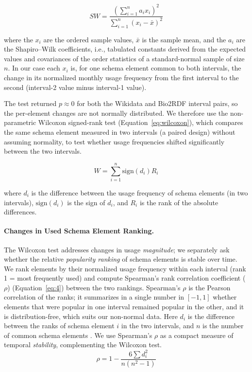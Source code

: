 \documentclass[sw]{iosart2x}
\begin{document}
\begin{equation}
SW = \frac{\left( \sum_{i=1}^n a_i x_i \right)^2}{\sum_{i=1}^n (x_i - \bar{x})^2}
\label{eq:shapiro}
\end{equation}

where the \( x_i \) are the ordered sample values, \( \bar{x} \) is the sample mean, and the \( a_i \) are the Shapiro--Wilk coefficients, i.e., tabulated constants derived from the expected values and covariances of the order statistics of a standard-normal sample of size \( n \). In our case each \( x_i \) is, for one schema element common to both intervals, the change in its normalized monthly usage frequency from the first interval to the second (interval-2 value minus interval-1 value).


The test returned $p \approx 0$ for both the Wikidata and Bio2RDF interval pairs, so the per-element changes are not normally distributed. We therefore use the non-parametric Wilcoxon signed-rank test (Equation~\ref{eq:wilcoxon}), which compares the same schema element measured in two intervals (a paired design) without assuming normality, to test whether usage frequencies shifted significantly between the two intervals.

\begin{equation}
W = \sum_{i=1}^n \text{sign}(d_i) R_i
\label{eq:wilcoxon}
\end{equation}

where \(d_i\) is the difference between the usage frequency of schema elements (in two intervals), \( \text{sign}(d_i) \) is the sign of \(d_i\), and \(R_i\) is the rank of the absolute differences.


\paragraph{\textbf{Changes in Used Schema Element Ranking.}}
The Wilcoxon test addresses changes in usage \emph{magnitude}; we separately ask whether the relative \emph{popularity ranking} of schema elements is stable over time. We rank elements by their normalized usage frequency within each interval (rank 1 = most frequently used) and compute Spearman's rank correlation coefficient (\( \rho \)) (Equation~\ref{eq:4}) between the two rankings. Spearman's \( \rho \) is the Pearson correlation of the ranks; it summarizes in a single number in \([-1,1]\) whether elements that were popular in one interval remained popular in the other, and it is distribution-free, which suits our non-normal data. Here \( d_i \) is the difference between the ranks of schema element \( i \) in the two intervals, and \( n \) is the number of common schema elements \cite{spearman1961proof}. We use Spearman's \( \rho \) as a compact measure of temporal \emph{stability}, complementing the Wilcoxon test.
\begin{equation}
\rho = 1 - \frac{6 \sum d_i^2}{n(n^2 - 1)}
\label{eq:4}
\end{equation}
\end{document}
